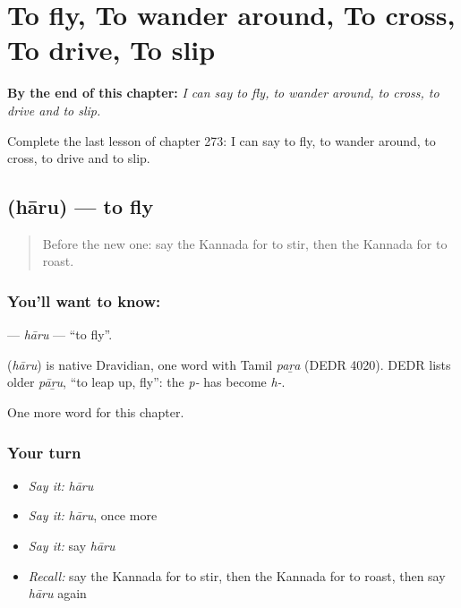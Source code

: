 
\chapter{To fly, To wander around, To cross, To drive, To slip}
\label{ch:ka-to-fly-to-wander-around-to-cross-to-drive-to-slip}

\begin{chapteropening}
\textbf{By the end of this chapter:} \emph{I can say to fly, to wander around, to cross, to drive and to slip.}

Complete the last lesson of chapter 273: I can say to fly, to wander around, to cross, to drive and to slip.
\end{chapteropening}

\section[\texorpdfstring{\kn{ಹಾರು} (hāru)}{ಹಾರು (hāru)}]{ (hāru) — to fly}

\label{lesson:KA-C273-haru}



\begin{quote}
Before the new one: say the Kannada for to stir, then the Kannada for to roast.
\end{quote}

\subsection*{You'll want to know: }
\textbf{} — \emph{hāru} — \textquotedblleft{}to fly\textquotedblright{}.

\begin{cousinweb}
\textbf{} (\emph{hāru}) is native Dravidian, one word with Tamil \emph{paṟa} (DEDR 4020). DEDR lists older \emph{pāṟu}, \textquotedblleft{}to leap up, fly\textquotedblright{}: the \emph{p-} has become \emph{h-}.
\end{cousinweb}

\begin{grammarlens}[title={What you've built}]
One more word for this chapter.
\end{grammarlens}

\subsection*{Your turn}
\begin{itemize}
\raggedright
  \item \emph{Say it:} \emph{hāru}
  \item \emph{Say it:} \emph{hāru}, once more
  \item \emph{Say it:} say \emph{hāru}
  \item \emph{Recall:} say the Kannada for to stir, then the Kannada for to roast, then say \emph{hāru} again
\end{itemize}

